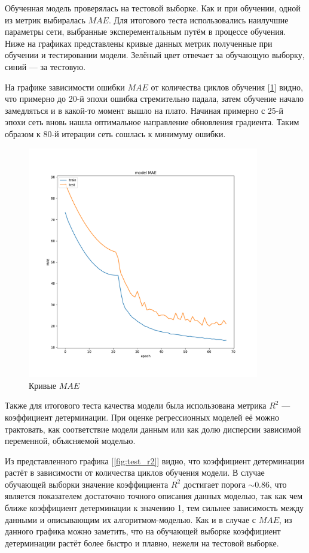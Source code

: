 \documentclass[14pt]{extarticle}
\begin{document}
Обученная модель проверялась на тестовой выборке. Как и при обучении, одной из метрик выбиралась $MAE$. Для итогового теста использовались наилучшие параметры сети, выбранные эксперементальным путём в процессе обучения. Ниже на графиках представлены кривые данных метрик полученные при обучении и тестировании модели. Зелёный цвет отвечает за обучающую выборку, синий --- за тестовую.

На графике зависимости ошибки $MAE$ от количества циклов обучения [\ref{fig:test_mae}] видно, что примерно до 20-й эпохи ошибка стремительно падала, затем обучение начало замедляться и в какой-то момент вышло на плато. Начиная примерно с 25-й эпохи сеть вновь нашла оптимальное направление обновления градиента. Таким образом к 80-й итерации сеть сошлась к минимуму ошибки.

\begin{figure}
	\centering
	\includegraphics[width=0.9\textwidth]{img/model_mae.pdf}
	\caption{Кривые $MAE$}
	\label{fig:test_mae}
\end{figure}

\newpage

Также для итогового теста качества модели была использована метрика $R^2$ --- коэффициент детерминации. При оценке регрессионных моделей её можно трактовать, как соответствие модели данным или как долю дисперсии зависимой переменной, объясняемой моделью.

Из представленного графика [\ref{fig:test_r2}] видно, что коэффициент детерминации растёт в зависимости от количества циклов обучения модели. В случае обучающей выборки значение коэффициента $R^2$ достигает порога $\sim$0.86, что является показателем достаточно точного описания данных моделью, так как чем ближе коэффициент детерминации к значению 1, тем сильнее зависимость между данными и описывающим их алгоритмом-моделью. Как и в случае с $MAE$, из данного графика можно заметить, что на обучающей выборке коэффициент детерминации растёт более быстро и плавно, нежели на тестовой выборке.
\end{document}
